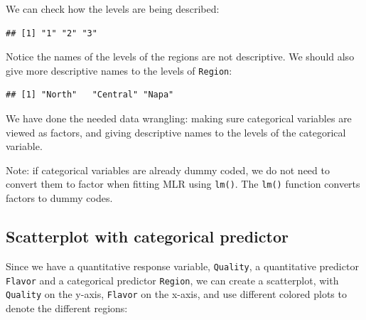 \documentclass[
]{book}
\newenvironment{Shaded}{\begin{snugshade}}{\end{snugshade}}
\newcommand{\DocumentationTok}[1]{\textcolor[rgb]{0.56,0.35,0.01}{\textbf{\textit{#1}}}}
\newcommand{\FunctionTok}[1]{\textcolor[rgb]{0.13,0.29,0.53}{\textbf{#1}}}
\newcommand{\NormalTok}[1]{#1}
\newcommand{\OtherTok}[1]{\textcolor[rgb]{0.56,0.35,0.01}{#1}}
\newcommand{\SpecialCharTok}[1]{\textcolor[rgb]{0.81,0.36,0.00}{\textbf{#1}}}
\newcommand{\StringTok}[1]{\textcolor[rgb]{0.31,0.60,0.02}{#1}}
\begin{document}
We can check how the levels are being described:

\begin{Shaded}
\end{Shaded}

\begin{verbatim}
## [1] "1" "2" "3"
\end{verbatim}

Notice the names of the levels of the regions are not descriptive. We should also give more descriptive names to the levels of \texttt{Region}:

\begin{Shaded}
\end{Shaded}

\begin{verbatim}
## [1] "North"   "Central" "Napa"
\end{verbatim}

We have done the needed data wrangling: making sure categorical variables are viewed as factors, and giving descriptive names to the levels of the categorical variable.

Note: if categorical variables are already dummy coded, we do not need to convert them to factor when fitting MLR using \texttt{lm()}. The \texttt{lm()} function converts factors to dummy codes.

\hypertarget{scatterplot-with-categorical-predictor}{%
\subsection*{Scatterplot with categorical predictor}\label{scatterplot-with-categorical-predictor}}

Since we have a quantitative response variable, \texttt{Quality}, a quantitative predictor \texttt{Flavor} and a categorical predictor \texttt{Region}, we can create a scatterplot, with \texttt{Quality} on the y-axis, \texttt{Flavor} on the x-axis, and use different colored plots to denote the different regions:
\end{document}
